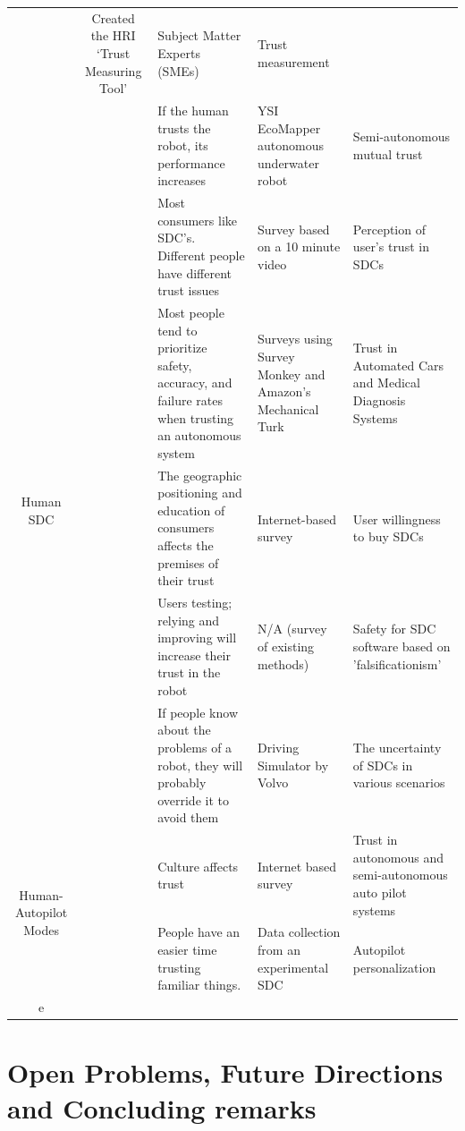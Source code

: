 \documentclass[runningheads,a4paper]{llncs}
\begin{document}
\begin{center}
\begin{longtable}{|c|c|p{4cm}|p{2cm}|p{2cm}|}
	& Created the HRI `Trust Measuring Tool'
	& Subject Matter Experts (SMEs)                
	& Trust measurement
	\\ \cline{2-5} 
	& \cite{wang2014human}
	& If the human trusts the robot, its performance increases
	& YSI EcoMapper autonomous underwater robot         
	& Semi-autonomous mutual trust
	\\ \hline
\multirow{5}{*}{Human SDC}      
	& \cite{howard2014public}  
	& Most consumers like SDC's. Different people have different trust issues                     
	& Survey based on a 10 minute video                        
	& Perception of user's trust in SDCs
	\\ \cline{2-5} 
	& \cite{carlson2014identifying}
	& Most people tend to prioritize safety, accuracy, and failure rates when trusting an autonomous system                       
	& Surveys using  Survey Monkey and Amazon’s Mechanical Turk                  
	& Trust in Automated Cars and Medical Diagnosis Systems               
	\\ \cline{2-5} 
	& \cite{kyriakidis2015public}
	& The geographic positioning and education of consumers affects the premises of their trust 
	& Internet-based survey                    
	& User willingness to buy SDCs
	\\ \cline{2-5} 
	& \cite{wagner2015philosophy}    
	& Users testing; relying and improving will increase their trust in the robot 
	& N/A (survey of existing methods)         
	& Safety for SDC software based on 'falsificationism'
	\\ \cline{2-5} 
	& \cite{helldin2013presenting}
	& If people know about the problems of a robot, they will probably override it to avoid them            
	& Driving Simulator by Volvo  
	& The uncertainty of SDCs in various scenarios            
	\\ \hline
	
	\multirow{2}{*}{Human-Autopilot Modes}    
	& \cite{winter2015indian}
	& Culture affects trust                        
	& Internet based survey               
	& Trust in autonomous and semi-autonomous auto pilot systems        
	\\ \cline{2-5} 
	& \cite{butakov2015driving}
	& People have an easier time trusting familiar things.                   
	& Data collection from an experimental SDC
	& Autopilot personalization
	\\ \hline
	
e

\end{longtable}
\end{center}

\section{Open Problems, Future Directions and Concluding remarks}
%

\end{document}
